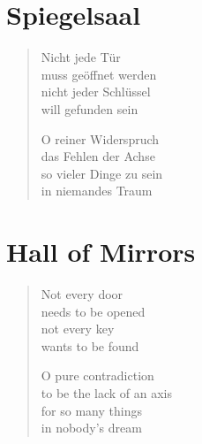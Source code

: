 
\cleartoverso

\section{Spiegelsaal}

\begin{verse}

Nicht jede Tür\\
muss geöffnet werden\\
nicht jeder Schlüssel\\
will gefunden sein

O reiner Widerspruch\\
das Fehlen der Achse\\
so vieler Dinge zu sein\\
in niemandes Traum

\end{verse}

\clearpage

\section{Hall of Mirrors}
\label{hall-of-mirrors}

\begin{verse}

Not every door\\
needs to be opened\\
not every key\\
wants to be found

O pure contradiction\\
to be the lack of an axis\\
for so many things\\
in nobody's dream

\end{verse}
